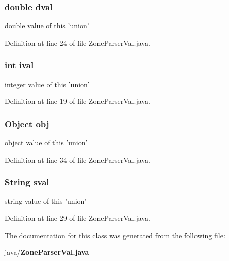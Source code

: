 \subsubsection[{dval}]{\setlength{\rightskip}{0pt plus 5cm}double dval}\label{classorg_1_1smallfoot_1_1parser_1_1zone_1_1ZoneParserVal_acefc0ddbab467d8de90049105846767c}


double value of this 'union' 



Definition at line 24 of file Zone\+Parser\+Val.\+java.

\subsubsection[{ival}]{\setlength{\rightskip}{0pt plus 5cm}int ival}\label{classorg_1_1smallfoot_1_1parser_1_1zone_1_1ZoneParserVal_a19233a42865dd45eae5fc8cf34a6775a}


integer value of this 'union' 



Definition at line 19 of file Zone\+Parser\+Val.\+java.

\subsubsection[{obj}]{\setlength{\rightskip}{0pt plus 5cm}Object obj}\label{classorg_1_1smallfoot_1_1parser_1_1zone_1_1ZoneParserVal_a3a6f22968f6ad522baa85c809b856bae}


object value of this 'union' 



Definition at line 34 of file Zone\+Parser\+Val.\+java.

\subsubsection[{sval}]{\setlength{\rightskip}{0pt plus 5cm}String sval}\label{classorg_1_1smallfoot_1_1parser_1_1zone_1_1ZoneParserVal_a277083a86232087ccdbaa1f691f3a3ff}


string value of this 'union' 



Definition at line 29 of file Zone\+Parser\+Val.\+java.



The documentation for this class was generated from the following file\+:\begin{DoxyCompactItemize}
\item 
java/{\bf Zone\+Parser\+Val.\+java}\end{DoxyCompactItemize}
